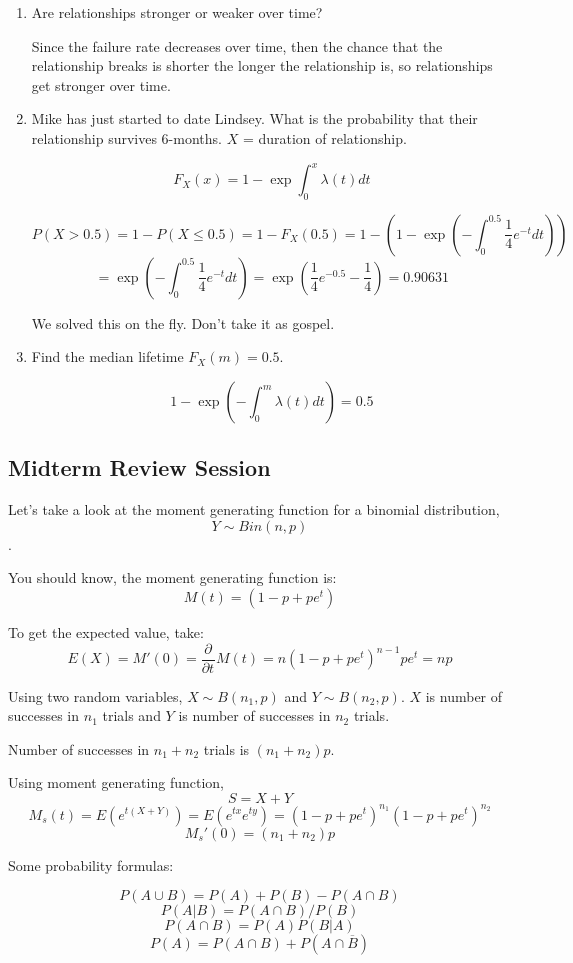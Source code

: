 \documentclass{report}
\newcommand{\deriv}[3][]{
  \ensuremath{\frac{\partial^{#1} {#2}}{\partial {#3}^{#1}}}}
\begin{document}
\begin{enumerate}
\item Are relationships stronger or weaker over time?

Since the failure rate decreases over time, then the chance that the relationship breaks is shorter the longer the relationship is, so relationships get stronger over time.

\item Mike has just started to date Lindsey. What is the probability that their relationship survives 6-months. $X$ = duration of relationship.

$$F_X(x) = 1 - \exp{\int_0^x \lambda(t) dt}$$

$$ P(X > 0.5) = 1- P(X \leq 0.5) = 1 - F_X(0.5) = 1-(1-\exp(- \int_{0}^{0.5} \frac{1}{4} e^{-t} dt))$$ $$ = \exp(- \int_{0}^{0.5} \frac{1}{4} e^{-t} dt) = \exp(\frac{1}{4} e^{-0.5} - \frac{1}{4}) = 0.90631 $$ 

We solved this on the fly. Don't take it as gospel.

\item Find the median lifetime $F_X(m) = 0.5$.

$$1-\exp(- \int_{0}^{m} \lambda(t) dt) = 0.5$$
\end{enumerate}

\subsection{Midterm Review Session}

Let's take a look at the moment generating function for a binomial distribution, $$Y \sim Bin(n,p)$$.

You should know, the moment generating function is: $$M(t) = (1-p+pe^t)$$ 

To get the expected value, take: $$E(X) = M'(0) = \deriv{}{t}{} M(t) = n(1-p+pe^t)^{n-1}pe^t = np$$

Using two random variables, $X \sim B(n_1,p)$ and $Y \sim B(n_2,p)$. $X$ is number of successes in $n_1$ trials and $Y$ is number of successes in $n_2$ trials.

Number of successes in $n_1+n_2$ trials is $(n_1 +n_2)p$.

Using moment generating function,  $$S = X +Y$$ $$M_s(t) = E(e^{t(X+Y)}) = E(e^{tx}e^{ty}) = (1-p+pe^t)^{n_1}(1-p+pe^t)^{n_2}$$ $$M_s'(0) = (n_1+n_2)p$$

Some probability formulas:

$$P(A \cup B) = P(A) + P(B) - P(A \cap B)$$
$$P(A|B) = P(A \cap B)/P(B) $$
$$P(A \cap B) = P(A)P(B|A)$$
$$P(A) = P(A \cap B) + P(A \cap \overline{B})$$
\end{document}
